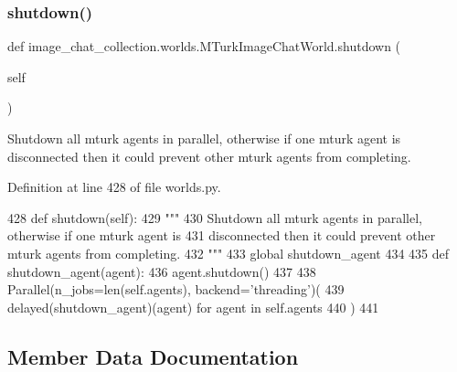 \subsubsection{\texorpdfstring{shutdown()}{shutdown()}}
{\footnotesize\ttfamily def image\+\_\+chat\+\_\+collection.\+worlds.\+M\+Turk\+Image\+Chat\+World.\+shutdown (\begin{DoxyParamCaption}\item[{}]{self }\end{DoxyParamCaption})}

\begin{DoxyVerb}Shutdown all mturk agents in parallel, otherwise if one mturk agent is
disconnected then it could prevent other mturk agents from completing.
\end{DoxyVerb}
 

Definition at line 428 of file worlds.\+py.


\begin{DoxyCode}
428     \textcolor{keyword}{def }shutdown(self):
429         \textcolor{stringliteral}{"""}
430 \textcolor{stringliteral}{        Shutdown all mturk agents in parallel, otherwise if one mturk agent is}
431 \textcolor{stringliteral}{        disconnected then it could prevent other mturk agents from completing.}
432 \textcolor{stringliteral}{        """}
433         \textcolor{keyword}{global} shutdown\_agent
434 
435         \textcolor{keyword}{def }shutdown\_agent(agent):
436             agent.shutdown()
437 
438         Parallel(n\_jobs=len(self.agents), backend=\textcolor{stringliteral}{'threading'})(
439             delayed(shutdown\_agent)(agent) \textcolor{keywordflow}{for} agent \textcolor{keywordflow}{in} self.agents
440         )
441 \end{DoxyCode}


\subsection{Member Data Documentation}
\mbox{\label{classimage__chat__collection_1_1worlds_1_1MTurkImageChatWorld_a8a1e906514af9c95bb1e859400c79a7c}} 
